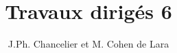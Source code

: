 

\textheight=660pt 
\textwidth=470pt 
\topmargin=-27pt 
\oddsidemargin=0pt 
\evensidemargin=0pt 
\def\cmarg{\hspace{1cm}}
\title{Travaux dirig\'es 6}
\author{J.Ph. Chancelier et M. Cohen de Lara}



\maketitle



\Mhlp

\Milo

\Milof

\Mlorentz

\Mlotest

\Mlotestf


